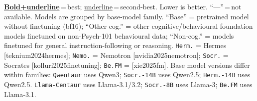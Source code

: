 \documentclass{article}
\providecommand{\citet}[1]{[#1]}
\providecommand{\citep}[1]{[#1]}
\newlength{\ctrtblwd}
\begin{document}
\begin{table}
\begin{minipage}{\ctrtblwd}
{\tiny \underline{\textbf{Bold+underline}}\,=\,best; \underline{underline}\,=\,second-best. Lower is better. ``---''\,=\,not available. Models are grouped by base-model family. ``Base'' = pretrained model without finetuning (bf16); ``Other cog.'' = other cognitive/behavioural foundation models finetuned on non-Psych-101 behavioural data; ``Non-cog.'' = models finetuned for general instruction-following or reasoning. \texttt{Herm.} = Hermes \citep{teknium2024hermes}; \texttt{Nemo.} = Nemotron \citep{nvidia2025nemotron}; \texttt{Socr.} = Socrates \citep{kolluri2025finetuning}; \texttt{Be.FM} = \citet{xie2025fm}. Base model versions differ within families: \texttt{Qwentaur} uses Qwen3; \texttt{Socr.-14B} uses Qwen2.5; \texttt{Herm.-14B} uses Qwen2.5. \texttt{Llama-Centaur} uses Llama-3.1/3.2; \texttt{Socr.-8B} uses Llama-3; \texttt{Be.FM} uses Llama-3.1.}
\end{minipage}
\captionsetup{width=\ctrtblwd}
\caption{Comparison of cognitively finetuned models with other behavioural foundation models and non-cognitive controls on Psych-101, grouped by base-model family (continued).}
\label{tab:family_comparison_cont}
\end{table}
\end{document}
